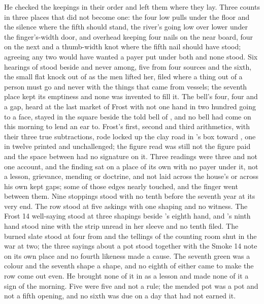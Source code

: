 He checked the keepings in their order and left them where they lay. Three counts in three places that did not become one: the four low pulls under the floor and the silence where the fifth should stand, the river's  going low over lower under the finger's-width door, and  overhead keeping four nails on the near board, four on the next and a thumb-width knot where the fifth nail should have stood; agreeing any two would have wanted a payer put under both and none stood. Six hearings of  stood beside and never among, five from four sources and the sixth, the small flat knock out of  as the men lifted her, filed where a thing out of a person must go and never with the things that came from vessels; the seventh place kept its emptiness and none was invented to fill it. The bell's four, four and a gap, heard at the last market of Frost with not one hand in two hundred going to a face, stayed in the square beside the told bell of , and no bell had come on this morning to lend an ear to. Frost's first, second and third arithmetics, with their three true subtractions, rode locked up the clay road in 's box toward , one in twelve printed and unchallenged; the figure read was still not the figure paid and the space between had no signature on it. Three readings were three and not one account, and the finding sat on a place of its own with no payer under it, not a lesson, grievance, mending or doctrine, and not laid across the house's  or across his own kept gaps; some of those edges nearly touched, and the finger went between them. Nine stoppings stood with no tenth before the seventh year at its very end. The row stood at five askings with one shaping and no witness. The Frost 14 well-saying stood at three shapings beside 's eighth hand, and 's ninth hand stood nine with the strip unread in her sleeve and no tenth filed. The burned slate stood at four from  and the tellings of the counting room shut in the war at two; the three sayings about a pot stood together with the Smoke 14 note on its own place and no fourth likeness made a cause. The seventh green was a colour and the seventh shape a shape, and no eighth of either came to make the row come out even. He brought none of it in as a lesson and made none of it a sign of the morning. Five were five and not a rule; the mended pot was a pot and not a fifth opening, and no sixth was due on a day that had not earned it.

